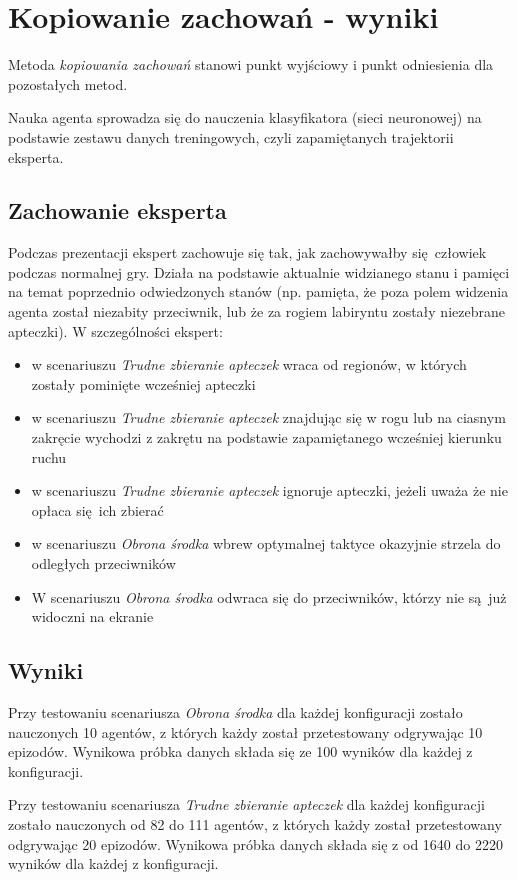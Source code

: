 \section{Kopiowanie zachowań - wyniki}\label{bc_results}
Metoda \textit{kopiowania zachowań} stanowi punkt wyjściowy i punkt odniesienia dla pozostałych metod.

Nauka agenta sprowadza się do nauczenia klasyfikatora (sieci neuronowej) na podstawie zestawu danych treningowych, czyli zapamiętanych trajektorii eksperta.


\subsection {Zachowanie eksperta}
Podczas prezentacji ekspert zachowuje się tak, jak zachowywałby się człowiek podczas normalnej gry. Działa na podstawie aktualnie widzianego stanu i pamięci na temat poprzednio odwiedzonych stanów (np. pamięta, że poza polem widzenia agenta został niezabity przeciwnik, lub że za rogiem labiryntu zostały niezebrane apteczki). W szczególności ekspert:
\begin{itemize}
\item{w scenariuszu \textit{Trudne zbieranie apteczek} wraca od regionów, w których zostały pominięte wcześniej apteczki}
\item{w scenariuszu \textit{Trudne zbieranie apteczek} znajdując się w rogu lub na ciasnym zakręcie wychodzi z zakrętu na podstawie zapamiętanego wcześniej kierunku ruchu}
\item{w scenariuszu \textit{Trudne zbieranie apteczek} ignoruje apteczki, jeżeli uważa że nie opłaca się ich zbierać}
\item{w scenariuszu \textit{Obrona środka} wbrew optymalnej taktyce okazyjnie strzela do odległych przeciwników}
\item{W scenariuszu \textit{Obrona środka} odwraca się do przeciwników, którzy nie są już widoczni na ekranie}
\end{itemize}


\subsection{Wyniki}

Przy testowaniu scenariusza \textit{Obrona środka} dla każdej konfiguracji zostało nauczonych 10 agentów, z których każdy został przetestowany odgrywając 10 epizodów. Wynikowa próbka danych składa się ze 100 wyników dla każdej z konfiguracji.

Przy testowaniu scenariusza \textit{Trudne zbieranie apteczek} dla każdej konfiguracji zostało nauczonych od 82 do 111 agentów, z których każdy został przetestowany odgrywając 20 epizodów. Wynikowa próbka danych składa się z od 1640 do 2220 wyników dla każdej z konfiguracji.

